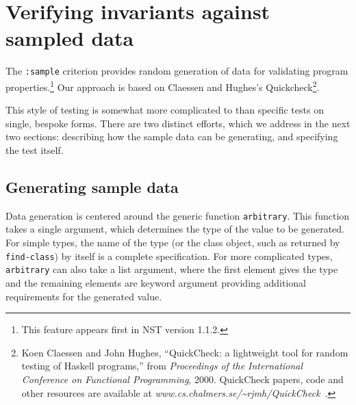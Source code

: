 
\section{Verifying invariants against sampled data}
\label{quickcheck}
The \texttt{:sample} criterion provides random generation of data for
validating program properties.\footnote{This feature appears first in
  NST version 1.1.2.}  Our approach is based on Claessen and Hughes's
Quickcheck\footnote{Koen Claessen and John Hughes, ``QuickCheck: a
  lightweight tool for random testing of Haskell programs,'' from
  \emph{Proceedings of the International Conference on Functional
    Programming}, 2000.  QuickCheck papers, code and other resources
  are available at \textsl{www.cs.chalmers.se/\~{}rjmh/QuickCheck}~.}.

This style of testing is somewhat more complicated to than specific
tests on single, bespoke forms.  There are two distinct efforts, which
we address in the next two sections: describing how the sample data
can be generating, and specifying the test itself.

\subsection{Generating sample data}
\label{sec:quickcheck-data}
Data generation is centered around the generic function
\texttt{arbitrary}.  This function takes a single argument, which
determines the type of the value to be generated.  For simple types,
the name of the type (or the class object, such as returned by
\texttt{find-class}) by itself is a complete specification.  For more
complicated types, \texttt{arbitrary} can also take a list argument,
where the first element gives the type and the remaining elements are
keyword argument providing additional requirements for the generated
value.

